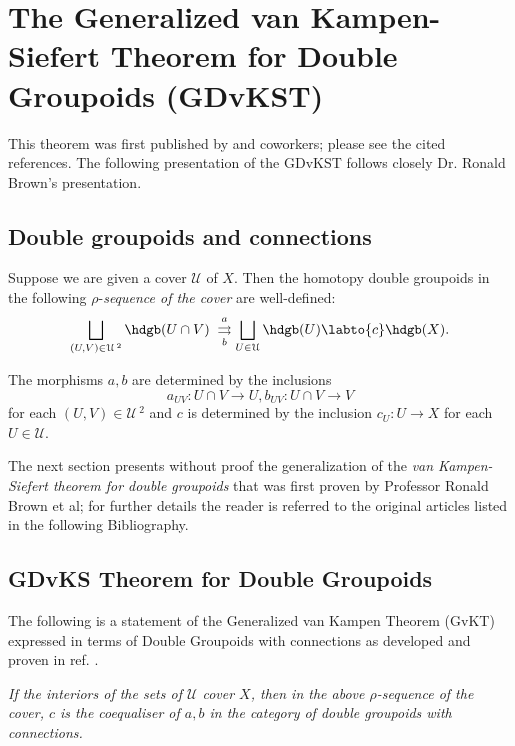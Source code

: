 \documentclass[12pt]{article}
\theoremstyle{plain}
\theoremstyle{definition}
\numberwithin{equation}{section}
\newcommand{\cU}{\mathcal U}
\begin{document}
\section{The Generalized van Kampen-Siefert Theorem for Double Groupoids (GDvKST)}

This theorem was first published by  and coworkers; please see the cited references.
The following presentation of the GDvKST follows closely Dr. Ronald Brown's presentation.  
\subsection{Double groupoids and connections}
Suppose we are given a cover $\cU$ of $X$. Then the homotopy double groupoids in the following $\rho$-{\em sequence of the cover} are
well-defined:
\begin{equation}
\bigsqcup _{(U,V)  \in \mathcal{U}\, ^2}
 \hdgb(U\cap V)\;
 \overset{a}{\underset{b}{\rightrightarrows}} \bigsqcup _{U \in \cU}\hdgb(U)
 \labto{c} \hdgb(X ) .\label{coeq} 
\end{equation}

The morphisms $a,b$ are determined by the inclusions 
$$a_{UV}:U\cap V\rightarrow U, b_{UV}:U\cap V\rightarrow V$$ for each $(U,V)  \in \mathcal{U}\,^2$ and 
$c$ is determined by the inclusion $c_U:U\rightarrow X$ for each $U \in \cU$.

The next section presents without proof the generalization of the {\em van Kampen-Siefert theorem for double groupoids} that was first proven by Professor Ronald Brown et al; for further details the reader is referred to the original articles listed in the following Bibliography. 

\subsection{GDvKS Theorem for Double Groupoids}

The following is a statement of the Generalized van Kampen Theorem (GvKT) expressed in terms of Double Groupoids with connections as developed and proven in ref. \cite{BHKP}.

\begin{thm} 

{\em If the interiors of the sets of $\cU $ cover $X$, then in the above 
$\rho$-sequence of the cover, $c$ is the coequaliser of $a,b$ in the category of double groupoids with connections.} 
\end{thm}
\end{document}
